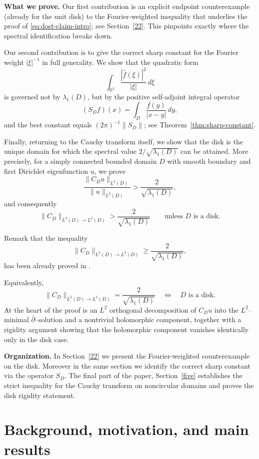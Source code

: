 \documentclass{amsart}
\newcommand{\R}{\mathbb{R}}
\theoremstyle{plain}
\theoremstyle{remark}
\begin{document}
\medskip
\noindent\textbf{What we prove.}
Our first contribution is an explicit endpoint counterexample (already for the
unit disk) to the Fourier-weighted inequality that underlies the proof of
\eqref{eq:dost-claim-intro}; see Section~\ref{22}. This pinpoints exactly where
the spectral identification breaks down.

Our second contribution is to give the correct sharp constant for the Fourier
weight $|\xi|^{-1}$ in full generality. We show that the quadratic form
\[
\int_{\R^2}\frac{|\widehat f(\xi)|^2}{|\xi|}\,d\xi
\]
is governed not by $\lambda_1(D)$, but by the positive self-adjoint integral
operator
\[
(S_D f)(x)=\int_D \frac{f(y)}{|x-y|}\,dy,
\]
and the best constant equals $(2\pi)^{-1}\|S_D\|$; see
Theorem~\ref{thm:sharp-constant}.

Finally, returning to the Cauchy transform itself, we show that the disk is the
unique domain for which the spectral value $2/\sqrt{\lambda_1(D)}$ can be
attained. More precisely, for a simply connected bounded domain $D$ with smooth
boundary and first Dirichlet eigenfunction $u$, we prove
\[
\frac{\|C_D u\|_{L^2(D)}}{\|u\|_{L^2(D)}}>\frac{2}{\sqrt{\lambda_1(D)}},
\]
and consequently
\[
\|C_D\|_{L^2(D)\to L^2(D)}>\frac{2}{\sqrt{\lambda_1(D)}}
\qquad\text{unless $D$ is a disk.}
\]

Remark that the inequality \[
\|C_D\|_{L^2(D)\to L^2(D)}\ge \frac{2}{\sqrt{\lambda_1(D)}},
\]  has been already proved in \cite{AndersonHinkkanen1989}.

Equivalently,
\[
\|C_D\|_{L^2(D)\to L^2(D)}=\frac{2}{\sqrt{\lambda_1(D)}} \quad\Longleftrightarrow\quad D \text{ is a disk}.
\]
At the heart of the proof is an $L^2$ orthogonal decomposition of $C_D u$ into
the $L^2$--minimal $\bar\partial$--solution and a nontrivial holomorphic
component, together with a rigidity argument showing that the holomorphic
component vanishes identically only in the disk case.

\medskip
\noindent\textbf{Organization.}
In Section~\ref{22} we present the Fourier-weighted counterexample on the disk. Moreover in the same section we identify the correct sharp constant via the operator $S_D$.
The final part of the paper, Section~\ref{five} establishes the strict inequality for the Cauchy
transform on noncircular domains and proves the disk rigidity statement.
\section{Background, motivation, and main results}\label{sec:intro}
\end{document}

